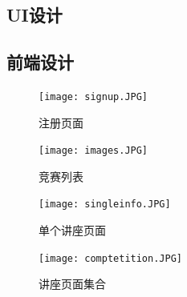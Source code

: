 \documentclass[UTF8]{ctexart}
\begin{document}
\begin{spacing}{1.3}
\section{UI设计}
\subsection{前端设计}
\begin{figure}[h]
    \centering
    \texttt{[image: signup.JPG]}
    \caption{注册页面}
    \label{fig:signup}
\end{figure}

\begin{figure}[h]
    \centering
    \texttt{[image: images.JPG]}
    \caption{竞赛列表}
    \label{fig:competition}
\end{figure}

\begin{figure}[h]
    \centering
    \texttt{[image: singleinfo.JPG]}
    \caption{单个讲座页面}
    \label{fig:single}
\end{figure}

\begin{figure}[h]
    \centering
    \texttt{[image: comptetition.JPG]}
    \caption{讲座页面集合}
    \label{fig:collection}
\end{figure}

\end{spacing}
\end{document}
